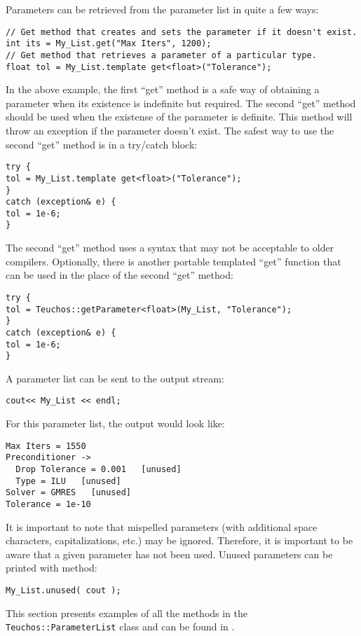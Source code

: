 Parameters can be retrieved from the parameter list in quite a few ways:
{\small
\begin{verbatim}
// Get method that creates and sets the parameter if it doesn't exist.
int its = My_List.get("Max Iters", 1200);
// Get method that retrieves a parameter of a particular type.
float tol = My_List.template get<float>("Tolerance");
\end{verbatim}}
\noindent In the above example, the first ``get'' method is a safe way of
obtaining a parameter when its existence is indefinite but required.
The second ``get'' method should be used when the existense of the parameter
is definite.  This method will throw an exception if the parameter doesn't exist. 
The safest way to use the second ``get'' method
is in a try/catch block:
{\small
\begin{verbatim}
try {
tol = My_List.template get<float>("Tolerance");
}
catch (exception& e) {
tol = 1e-6;
}
\end{verbatim}}
\noindent The second ``get'' method uses a syntax that may not be
acceptable to older compilers.  Optionally, there is another portable templated 
``get'' function that can be used in the place of the second ``get'' method:
{\small
\begin{verbatim}
try {
tol = Teuchos::getParameter<float>(My_List, "Tolerance");
}
catch (exception& e) {
tol = 1e-6;
}
\end{verbatim}}

A parameter list can be sent to the output stream:
{\small
\begin{verbatim}
cout<< My_List << endl;
\end{verbatim}}
\noindent For this parameter list, the output would look like:
{\small
\begin{verbatim}
Max Iters = 1550
Preconditioner ->
  Drop Tolerance = 0.001   [unused]
  Type = ILU   [unused]
Solver = GMRES   [unused]
Tolerance = 1e-10
\end{verbatim}}
\noindent It is important to note that mispelled parameters 
(with additional space characters, capitalizations, etc.) may be ignored.  
Therefore, it is important to be aware that a given parameter has not been used. 
Unused parameters can be printed with method:
{\small
\begin{verbatim}
My_List.unused( cout );
\end{verbatim}}
This section presents examples of all the methods in the 
{\tt Teuchos::ParameterList} class and can be found in
.  

